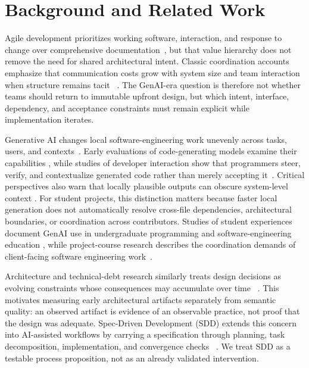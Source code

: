 \section{Background and Related Work}

Agile development prioritizes working software, interaction, and response to
change over comprehensive documentation~\cite{agile_manifesto_2001}, but that
value hierarchy does not remove the need for shared architectural intent.
Classic coordination accounts emphasize that communication costs grow with
system size and team interaction when structure remains tacit
~\cite{brooks_1975_mythical_man_month,demarco_lister_1987_peopleware}. The
GenAI-era question is therefore not whether teams should return to immutable
upfront design, but which intent, interface, dependency, and acceptance
constraints must remain explicit while implementation iterates.

Generative AI changes local software-engineering work unevenly across tasks,
users, and contexts~\cite{carleton2024generative,banh2025copiloting,russo2024navigating,ieee2025transforming,staron2025exploring}.
Early evaluations of code-generating models examine their capabilities
\cite{chen_2021_evaluating_code_llms}, while studies of developer interaction
show that programmers steer, verify, and contextualize generated code rather
than merely accepting it~\cite{barke2023grounded}. Critical perspectives also
warn that locally plausible outputs can obscure system-level context
\cite{miller_2023_coordination_ai_teams}. For student projects, this distinction
matters because faster local generation does not automatically resolve
cross-file dependencies, architectural boundaries, or coordination across
contributors. Studies of student experiences document GenAI use in
undergraduate programming and software-engineering education
\cite{williams_2024_ai_software_engineering_education,yabaku2024usage}, while
project-course research describes the coordination demands of client-facing
software engineering work~\cite{perez_2022_planning_and_rework}.

Architecture and technical-debt research similarly treats design decisions as
evolving constraints whose consequences may accumulate over time
~\cite{cunningham_1992_technical_debt,fowler2009technicaldebt,kruchten2012technicaldebt,verdecchia2018architectural,nayebi2019longitudinal,li_2015_technical_debt_mapping}.
This motivates measuring early architectural artifacts separately from semantic
quality: an observed artifact is evidence of an observable practice, not proof
that the design was adequate. Spec-Driven Development (SDD) extends this
concern into AI-assisted workflows by carrying a specification through
planning, task decomposition, implementation, and convergence checks
~\cite{github2025spec,thoughtworks202Xspec}. We treat SDD as a testable
process proposition, not as an already validated intervention.

